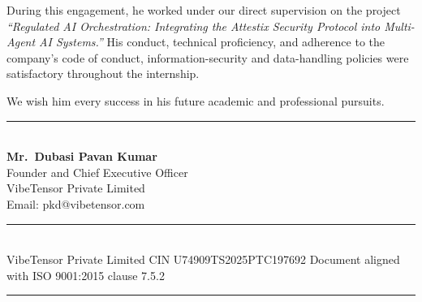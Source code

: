 \documentclass[12pt,a4paper]{article}
\begin{document}
\noindent
During this engagement, he worked under our direct supervision on the project
\textit{``Regulated AI Orchestration: Integrating the Attestix Security
Protocol into Multi-Agent AI Systems.''} His conduct, technical proficiency,
and adherence to the company's code of conduct, information-security and
data-handling policies were satisfactory throughout the internship.

\vspace{0.15in}

\noindent
We wish him every success in his future academic and professional pursuits.

\vspace{0.6in}

\begin{flushleft}
\rule{6cm}{0.4pt}\\[0.05in]
\textbf{Mr.\ Dubasi Pavan Kumar}\\
Founder and Chief Executive Officer\\
VibeTensor Private Limited\\
Email: pkd@vibetensor.com
\end{flushleft}

\vfill
\noindent\rule{\linewidth}{0.3pt}\\
{\scriptsize VibeTensor Private Limited \quad CIN U74909TS2025PTC197692 \quad Document aligned with ISO 9001:2015 clause 7.5.2}\\
\noindent\rule{\linewidth}{1.2pt}
\end{document}
